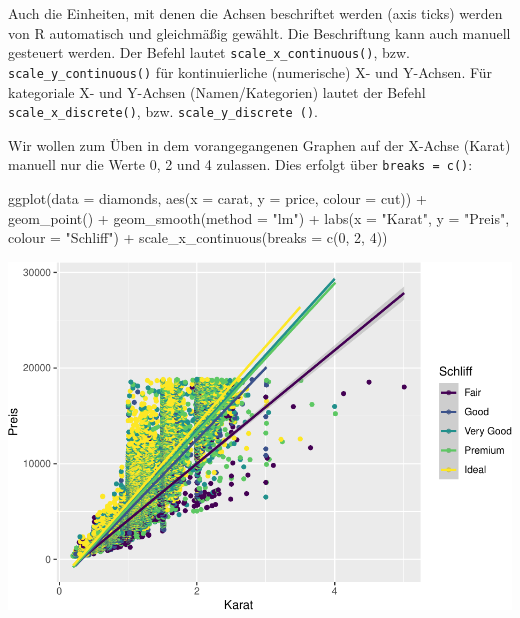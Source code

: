 \documentclass[
]{book}
\newenvironment{Shaded}{\begin{snugshade}}{\end{snugshade}}
\newcommand{\AttributeTok}[1]{\textcolor[rgb]{0.77,0.63,0.00}{#1}}
\newcommand{\DecValTok}[1]{\textcolor[rgb]{0.00,0.00,0.81}{#1}}
\newcommand{\FunctionTok}[1]{\textcolor[rgb]{0.00,0.00,0.00}{#1}}
\newcommand{\NormalTok}[1]{#1}
\newcommand{\SpecialCharTok}[1]{\textcolor[rgb]{0.00,0.00,0.00}{#1}}
\newcommand{\StringTok}[1]{\textcolor[rgb]{0.31,0.60,0.02}{#1}}
\begin{document}
Auch die Einheiten, mit denen die Achsen beschriftet werden (axis ticks) werden von R automatisch und gleichmäßig gewählt. Die Beschriftung kann auch manuell gesteuert werden. Der Befehl lautet \texttt{scale\_x\_continuous()}, bzw. \texttt{scale\_y\_continuous()} für kontinuierliche (numerische) X- und Y-Achsen. Für kategoriale X- und Y-Achsen (Namen/Kategorien) lautet der Befehl \texttt{scale\_x\_discrete()}, bzw. \texttt{scale\_y\_discrete\ ()}.

Wir wollen zum Üben in dem vorangegangenen Graphen auf der X-Achse (Karat) manuell nur die Werte 0, 2 und 4 zulassen. Dies erfolgt über \texttt{breaks\ =\ c()}:

\begin{Shaded}
\begin{Highlighting}[]
\FunctionTok{ggplot}\NormalTok{(}\AttributeTok{data =}\NormalTok{ diamonds, }\FunctionTok{aes}\NormalTok{(}\AttributeTok{x =}\NormalTok{ carat, }\AttributeTok{y =}\NormalTok{ price, }\AttributeTok{colour =}\NormalTok{ cut)) }\SpecialCharTok{+}
  \FunctionTok{geom\_point}\NormalTok{() }\SpecialCharTok{+}
  \FunctionTok{geom\_smooth}\NormalTok{(}\AttributeTok{method =} \StringTok{"lm"}\NormalTok{) }\SpecialCharTok{+}
  \FunctionTok{labs}\NormalTok{(}\AttributeTok{x =} \StringTok{"Karat"}\NormalTok{, }\AttributeTok{y =} \StringTok{"Preis"}\NormalTok{, }\AttributeTok{colour =} \StringTok{"Schliff"}\NormalTok{) }\SpecialCharTok{+}
  \FunctionTok{scale\_x\_continuous}\NormalTok{(}\AttributeTok{breaks =} \FunctionTok{c}\NormalTok{(}\DecValTok{0}\NormalTok{, }\DecValTok{2}\NormalTok{, }\DecValTok{4}\NormalTok{))}
\end{Highlighting}
\end{Shaded}

\includegraphics{CFH_R_bookdown_files/figure-latex/unnamed-chunk-176-1.pdf}
\end{document}

